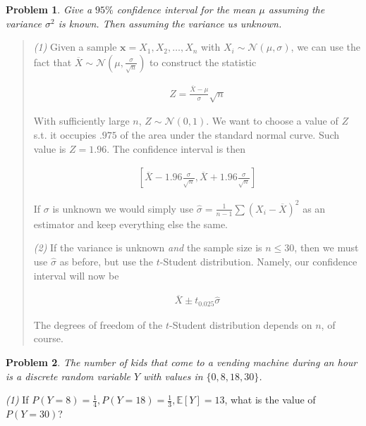 \documentclass[a4paper, 12pt]{article}
\newtheorem{problem}{Problem}
\newtheorem{problem}{Problem}
\begin{document}
\begin{problem}
    Give a $95\%$ confidence interval for the mean $\mu$ assuming the variance
    $\sigma^2$ is known. Then assuming the variance us unknown.
\end{problem}


\small
\begin{quote}

\textit{(1)} Given a sample $\textbf{x} = X_1, X_2, \ldots, X_n$ with $X_i \sim
\mathcal{N}(\mu, \sigma)$, we can use the fact that $\overline{X} \sim
\mathcal{N}(\mu, \frac{\sigma}{\sqrt{n} } )$ to construct the statistic

\begin{align*}
    Z = \frac{\overline{X} - \mu}{\sigma} \sqrt{n} 
\end{align*}

With sufficiently large $n$, $Z \sim \mathcal{N}(0, 1)$. We want to choose a
value of $Z$ s.t. it occupies $.975$ of the area under the standard normal
curve. Such value is $Z = 1.96$. The confidence interval is then 

\begin{align*}
    \left[ \overline{X} - 1.96 \frac{\sigma}{\sqrt{n} }, \overline{X} + 1.96
    \frac{\sigma}{\sqrt{n} } \right] 
\end{align*}

If $\sigma$ is unknown we would simply use $\hat{\sigma} = \frac{1}{n-1}\sum
(X_i
- \overline{X})^2$ as an estimator and keep everything else the same.

\textit{(2)} If the variance is unknown \textit{and} the sample size is $n \leq
30$, then we must use $\hat{\sigma}$ as before, but use the $t$-Student
distribution. Namely, our confidence interval will now be 

\begin{align*}
    \overline{X} \pm t_{0.025} \hat{\sigma}
\end{align*}

The degrees of freedom of the $t$-Student distribution depends on $n$, of
course.

\end{quote}
\normalsize

\pagebreak 

\begin{problem}
    The number of kids that come to a vending machine during an hour is a
    discrete random variable $Y$ with values in $\{0, 8, 18, 30\}$.
\end{problem}

\textit{(1)} If $P(Y = 8) = \frac{1}{4}, P(Y = 18) = \frac{1}{3},
\mathbb{E}\left[ Y \right] = 13$, what is the value of $P(Y = 30)$?
\end{document}
